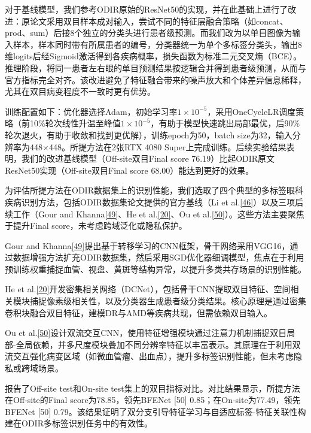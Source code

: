 对于基线模型，我们参考ODIR原始的ResNet50的实现，并在此基础上进行了改进：原论文采用双目样本成对输入，尝试不同的特征层融合策略（如concat、prod、sum）后接8个独立的分类头进行患者级预测。而我们改为以单目图像为输入样本，样本同时带有所属患者的编号，分类器统一为单个多标签分类头，输出8维logits后经Sigmoid激活得到各疾病概率，损失函数为标准二元交叉熵（BCE）。推理阶段，将同一患者左右眼的单目预测结果按逻辑合并得到患者级预测，从而与官方指标完全对齐。该改进避免了特征融合带来的噪声放大和个体差异信息稀释，尤其在双目病变程度不一致时更有优势。

训练配置如下：优化器选择Adam，初始学习率\(1 \times 10^{-5}\)，采用OneCycleLR调度策略（前10\%轮次线性升温至峰值\(1 \times 10^{-5}\)，有助于模型快速跳出局部最优，后90\%轮次退火，有助于收敛和找到更优解），训练epoch为50，batch size为32，输入分辨率为448×448。所提方法在2张RTX 4080 Super上完成训练。后续实验结果表明，我们的改进基线模型（Off-site双目Final score 76.19）比起ODIR原文ResNet50实现（Off-site双目Final score 68.00）能达到更好的效果。


为评估所提方法在ODIR数据集上的识别性能，我们选取了四个典型的多标签眼科疾病识别方法，包括ODIR数据集论文提供的官方基线（Li et al.\hyperref[_Ref213949402]{{[}46{]}}）以及三项后续工作（Gour and Khanna\hyperref[_Ref214903299]{{[}49{]}}、He et al.\hyperref[_Ref213950338]{{[}20{]}}、Ou et al.\hyperref[_Ref214903327]{{[}50{]}}）。这些方法主要聚焦于提升Final score，未考虑跨域泛化或隐私保护。

Gour and Khanna\hyperref[_Ref214903299]{{[}49{]}}提出基于转移学习的CNN框架，骨干网络采用VGG16，通过数据增强方法扩充ODIR数据集，然后采用SGD优化器细调模型，焦点在于利用预训练权重捕捉血管、视盘、黄斑等结构异常，以提升多类共存场景的识别性能。

He et al.\hyperref[_Ref213950338]{{[}20{]}}开发密集相关网络（DCNet），包括骨干CNN提取双目特征、空间相关模块捕捉像素级相关性，以及分类器生成患者级分类结果。核心原理是通过密集卷积块融合双目特征，建模DR与AMD等疾病共现，但需依赖双目输入。

Ou et al.\hyperref[_Ref214903327]{{[}50{]}}设计双流交互CNN，使用特征增强模块通过注意力机制捕捉双目局部-全局依赖，并多尺度模块叠加不同分辨率特征以丰富表示。其原理在于利用双流交互强化病变区域（如微血管瘤、出血点），提升多标签识别性能，但未考虑隐私或跨域场景。

报告了Off-site test和On-site test集上的双目指标对比。对比结果显示，所提方法在Off-site的Final score为78.85，领先BFENet [50] 0.85；在On-site为77.49，领先BFENet [50] 0.79。该结果证明了双分支引导特征学习与自适应标签-特征关联性构建在ODIR多标签识别任务中的有效性。

